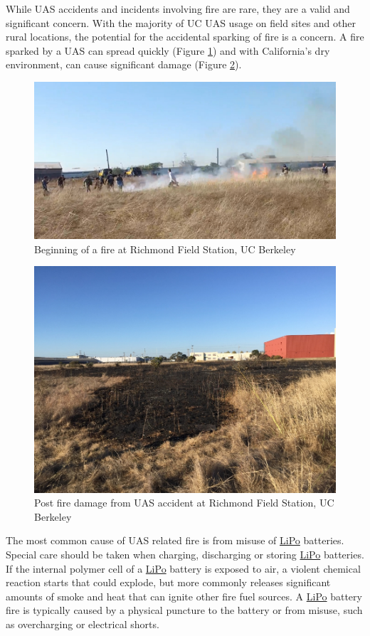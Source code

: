 \documentclass[
]{book}
\begin{document}
While UAS accidents and incidents involving fire are rare, they are a valid and significant concern. With the majority of UC UAS usage on field sites and other rural locations, the potential for the accidental sparking of fire is a concern. A fire sparked by a UAS can spread quickly (Figure \ref{fig:fire-start}) and with California's dry environment, can cause significant damage (Figure \ref{fig:fire-damage}).

\begin{figure}

{\centering \includegraphics[width=0.6\linewidth]{images/fire_start} 

}

\caption{Beginning of a fire at Richmond Field Station, UC Berkeley}\label{fig:fire-start}
\end{figure}

\begin{figure}

{\centering \includegraphics[width=0.6\linewidth]{images/fire_damage} 

}

\caption{Post fire damage from UAS accident at Richmond Field Station, UC Berkeley}\label{fig:fire-damage}
\end{figure}

The most common cause of UAS related fire is from misuse of \protect\hyperlink{LiPo}{LiPo} batteries. Special care should be taken when charging, discharging or storing \protect\hyperlink{LiPo}{LiPo} batteries. If the internal polymer cell of a \protect\hyperlink{LiPo}{LiPo} battery is exposed to air, a violent chemical reaction starts that could explode, but more commonly releases significant amounts of smoke and heat that can ignite other fire fuel sources. A \protect\hyperlink{LiPo}{LiPo} battery fire is typically caused by a physical puncture to the battery or from misuse, such as overcharging or electrical shorts.
\end{document}
